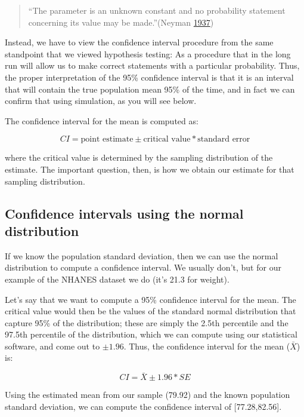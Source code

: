 \documentclass[12pt,]{book}
\theoremstyle{definition}
\theoremstyle{definition}
\theoremstyle{definition}
\theoremstyle{remark}
\begin{document}
\begin{quote}
``The parameter is an unknown constant and no probability statement concerning its value may be made.''(Neyman \protect\hyperlink{ref-Neyman37}{1937})
\end{quote}

Instead, we have to view the confidence interval procedure from the same standpoint that we viewed hypothesis testing: As a procedure that in the long run will allow us to make correct statements with a particular probability. Thus, the proper interpretation of the 95\% confidence interval is that it is an interval that will contain the true population mean 95\% of the time, and in fact we can confirm that using simulation, as you will see below.

The confidence interval for the mean is computed as:

\[
CI = \text{point estimate} \pm \text{critical value} * \text{standard error}
\]

where the critical value is determined by the sampling distribution of the estimate. The important question, then, is how we obtain our estimate for that sampling distribution.

\hypertarget{confidence-intervals-using-the-normal-distribution}{%
\subsection{Confidence intervals using the normal distribution}\label{confidence-intervals-using-the-normal-distribution}}

If we know the population standard deviation, then we can use the normal distribution to compute a confidence interval. We usually don't, but for our example of the NHANES dataset we do (it's 21.3 for weight).

Let's say that we want to compute a 95\% confidence interval for the mean. The critical value would then be the values of the standard normal distribution that capture 95\% of the distribution; these are simply the 2.5th percentile and the 97.5th percentile of the distribution, which we can compute using our statistical software, and come out to \(\pm 1.96\). Thus, the confidence interval for the mean (\(\bar{X}\)) is:

\[
CI = \bar{X} \pm 1.96*SE
\]

Using the estimated mean from our sample (79.92) and the known population standard deviation, we can compute the confidence interval of {[}77.28,82.56{]}.
\end{document}
